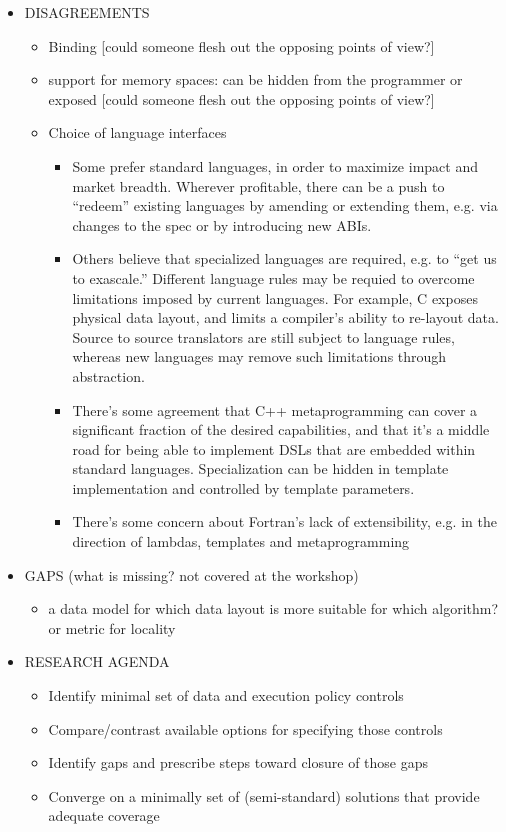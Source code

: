 \begin{itemize}
\item  DISAGREEMENTS
  \begin{itemize}
  \item Binding [could someone flesh out the opposing points of view?]
  \item support for memory spaces: can be hidden from the programmer or exposed [could someone flesh out the opposing points of view?]
  \item Choice of language interfaces
  \begin{itemize}
  \item Some prefer standard languages, in order to maximize impact and market breadth.  Wherever profitable, there can be a push to ``redeem'' existing languages by amending or extending them, e.g. via changes to the spec or by introducing new ABIs.
  \item Others believe that specialized languages are required, e.g. to ``get us to exascale.''  Different language rules may be requied to overcome limitations imposed by current languages.  For example, C exposes physical data layout, and limits a compiler's ability to re-layout data.  Source to source translators are still subject to language rules, whereas new languages may remove such limitations through abstraction.
  \item There's some agreement that C++ metaprogramming can cover a significant fraction of the desired capabilities, and that it's a middle road for being able to implement DSLs that are embedded within standard languages.  Specialization can be hidden in template implementation and controlled by template parameters.
  \item There's some concern about Fortran's lack of extensibility, e.g. in the direction of lambdas, templates and metaprogramming
  \end{itemize}
  \end{itemize}

\item GAPS (what is missing? not covered at the workshop)
  \begin{itemize}
  \item a data model for which data layout is more suitable for which algorithm? or metric for locality
  \end{itemize}

\item RESEARCH AGENDA
  \begin{itemize}
  \item Identify minimal set of data and execution policy controls
  \item Compare/contrast available options for specifying those controls
  \item Identify gaps and prescribe steps toward closure of those gaps
  \item Converge on a minimally set of (semi-standard) solutions that provide adequate coverage
  \end{itemize}

\end{itemize}




